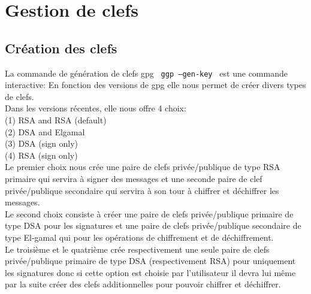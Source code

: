
\section{Gestion de clefs}
\subsection{Création des clefs}



La commande de génération de clefs gpg  \texttt{ ggp --gen-key } est une commande interactive:
En fonction des versions de gpg elle nous permet de créer divers types de clefs.\\
Dans les versions récentes, elle nous offre 4 choix:\\
   (1) RSA and RSA (default)\\
   (2) DSA and Elgamal\\
   (3) DSA (sign only)\\
   (4) RSA (sign only)\\
   
Le premier choix nous crée une paire de clefs privée/publique de type RSA primaire qui servira à signer des messages et une seconde 
paire de clef privée/publique secondaire qui servira à son tour à chiffrer et déchiffrer les messages.\\
Le second choix consiste à créer une paire de clefs privée/publique primaire de type DSA pour les signatures et une paire de clefs 
privée/publique secondaire de type El-gamal qui pour les opérations de chiffrement et de déchiffrement.\\
Le troisième et le quatrième crée respectivement une seule paire de clefs privée/publique primaire de type DSA (respectivement RSA) pour
uniquement les signatures donc si cette option est choisie par l'utilisateur il devra lui même par la suite créer des clefs additionnelles 
pour pouvoir chiffrer et déchiffrer.\\

